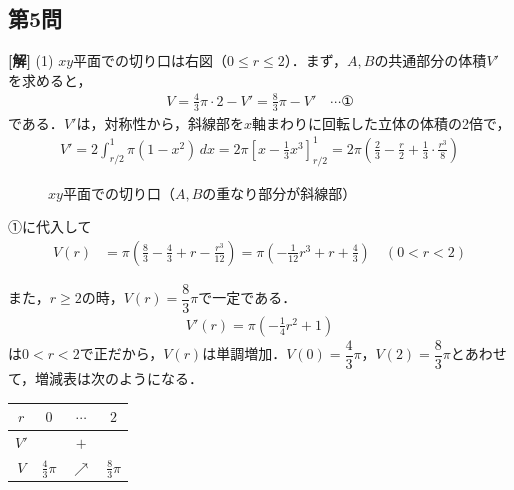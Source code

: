 \documentclass[../main.tex]{subfiles}
\begin{document}
\bigskip

\subsection*{第5問}

\noindent
{\bf [解]}
(1) $xy$平面での切り口は右図（$0\le r\le2$）．まず，$A,B$の共通部分の体積$V'$を求めると，
\begin{align*}
  V=\frac43\pi\cdot2-V'=\frac83\pi-V'\quad\cdots①
\end{align*}
である．$V'$は，対称性から，斜線部を$x$軸まわりに回転した立体の体積の2倍で，
\begin{align*}
  V'=2\int_{r/2}^1\pi(1-x^2)\,dx=2\pi\left[x-\frac13x^3\right]_{r/2}^1=2\pi\left(\frac23-\frac r2+\frac13\cdot\frac{r^3}8\right)
\end{align*}

\begin{figure}[htb]
  \centering
  \caption{$xy$平面での切り口（$A,B$の重なり部分が斜線部）}
\end{figure}

①に代入して
\begin{align*}
  V(r)&=\pi\left(\frac83-\frac43+r-\frac{r^3}{12}\right)=\pi\left(-\frac1{12}r^3+r+\frac43\right)\quad(0<r<2)
\end{align*}

また，$r\ge2$の時，$V(r)=\dfrac83\pi$で一定である．
\begin{align*}
  V'(r)=\pi\left(-\frac14r^2+1\right)
\end{align*}
は$0<r<2$で正だから，$V(r)$は単調増加．$V(0)=\dfrac43\pi$，$V(2)=\dfrac83\pi$とあわせて，増減表は次のようになる．
\begin{center}
  \begin{tabular}{c|ccc}
    $r$ & $0$ & $\cdots$ & $2$\\
    \hline
    $V'$ & & $+$ & \\
    $V$ & $\frac43\pi$ & $\nearrow$ & $\frac83\pi$
  \end{tabular}
\end{center}
\end{document}
